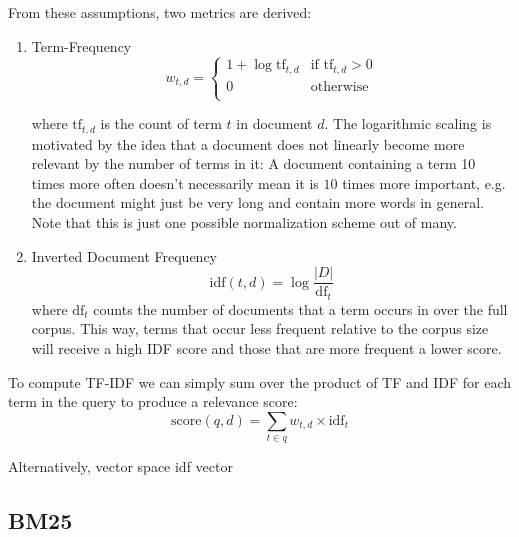 From these assumptions, two metrics are derived:
\begin{enumerate}
    \item Term-Frequency
          \begin{equation}
              w_{t,d} = \begin{cases}
                  1 + \log \text{tf}_{t, d} & \text{if } \text{tf}_{t, d} > 0 \\
                  0                         & \text{otherwise}                \\
              \end{cases}
          \end{equation}

          where $\text{tf}_{t, d}$ is the count of term $t$ in document $d$. The logarithmic scaling is motivated by the idea that a document does not linearly become more relevant by the number of terms in it: A document containing a term 10 times more often doesn't necessarily mean it is $10$ times more important, e.g. the document might just be very long and contain more words in general. Note that this is just one possible normalization scheme out of many.

    \item Inverted Document Frequency
          \begin{equation}
              \text{idf}(t, d) = \log \frac{|D|}{\text{df}_t}
          \end{equation}
          where $\text{df}_t$ counts the number of documents that a term occurs in over the full corpus. This way, terms that occur less frequent relative to the corpus size will receive a high IDF score and those that are more frequent a lower score.

\end{enumerate}

\begin{table}

\end{table}
To compute TF-IDF we can simply sum over the product of TF and IDF for each term in the query to produce a relevance score:
\begin{equation}
    \text{score}(q, d) = \sum_{t \in q} w_{t,d} \times \text{idf}_t
\end{equation}

Alternatively, vector space idf vector
\subsection{BM25}

